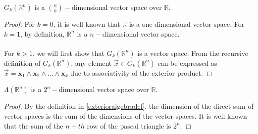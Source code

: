 \documentclass{article}
\numberwithin{equation}{section}
\newcommand{\R}{\mathbb{R}}
\newcommand{\ve}{\mathbf}
\begin{document}
\begin{proposition}
    $G_k(\R^n)$ is a $\binom{n}{k}-$dimensional vector space over $\R$.
    \begin{proof}
        For $k=0$, it is well known that $\R$ is a one-dimensional vector space. For $k=1$, by definition, $\R^n$ is a $n-$dimensional vector space.
\\\\
        For $k>1$, we will first show that $G_k(\R^n)$ is a vector space. From the recursive definition of $G_k(\R^n)$, any element $\vec x\in G_k(\R^n)$ can be expressed as $\vec x=\ve x_1\wedge\ve x_2\wedge...\wedge\ve x_k$ due to associativity of the exterior product.
    \end{proof}
    \begin{corollary}
        $\Lambda(\R^n)$ is a $2^n-$dimensional vector space over $\R$.
        \begin{proof}
            By the definition in \eqref{exterioralgebradef}, the dimension of the direct sum of vector spaces is the sum of the dimensions of the vector spaces. It is well known that the sum of the $n-th$ row of the pascal triangle is $2^n$.
        \end{proof}
    \end{corollary}
\end{proposition}
\end{document}
